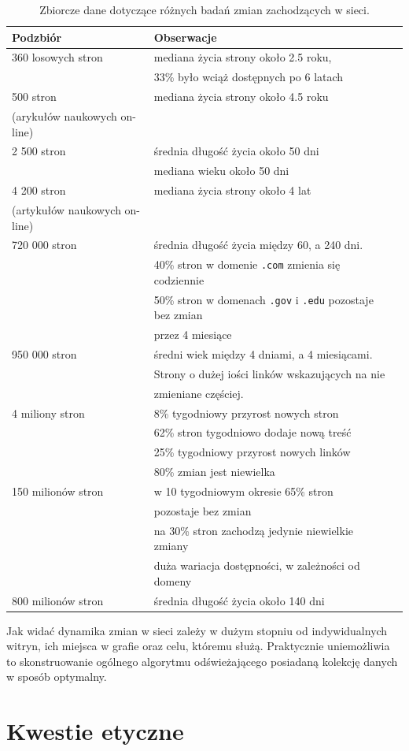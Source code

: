 \begin{table}[!h]
\caption{Zbiorcze dane dotyczące różnych badań zmian zachodzących w sieci.}
\begin{tabular}{llr}
\hline
\cline{1-2}
Podzbiór    & Obserwacje \\
\hline
360 losowych stron & mediana życia strony około 2.5 roku, \\
&33\% było wciąż dostępnych po 6 latach \\
\hline
500 stron & mediana życia strony około 4.5 roku \\
(arykułów naukowych on-line)&\\
\hline
2 500 stron & średnia długość życia około 50 dni \\
& mediana wieku około 50 dni \\
\hline
4 200 stron & mediana życia strony około 4 lat \\
(artykułów naukowych on-line) &\\
\hline
720 000 stron & średnia długość życia między 60, a 240 dni.\\
& 40\% stron w domenie \texttt{.com} zmienia się codziennie \\
& 50\% stron w domenach \texttt{.gov} i \texttt{.edu} pozostaje bez zmian\\
& przez 4 miesiące \\
\hline
950 000 stron & średni wiek między 4 dniami, a 4 miesiącami.\\
& Strony o dużej iości linków wskazujących na nie\\
& zmieniane częściej.\\
\hline
4 miliony stron & 8\% tygodniowy przyrost nowych stron\\
& 62\% stron tygodniowo dodaje nową treść\\
& 25\% tygodniowy przyrost nowych linków\\
& 80\% zmian jest niewielka\\
\hline
150 milionów stron & w 10 tygodniowym okresie 65\% stron\\
&pozostaje bez zmian\\
& na 30\% stron zachodzą jedynie niewielkie zmiany\\
& duża wariacja dostępności, w zależności od domeny\\
\hline
800 milionów stron & średnia długość życia około 140 dni\\
\hline
\end{tabular} 
\end{table}

Jak widać dynamika zmian w sieci zależy w dużym stopniu od indywidualnych witryn, ich miejsca w grafie oraz
celu, któremu służą. Praktycznie uniemożliwia to skonstruowanie ogólnego algorytmu odświeżającego posiadaną
kolekcję danych w sposób optymalny.


\section{Kwestie etyczne}
\label{sec:etyczne}

